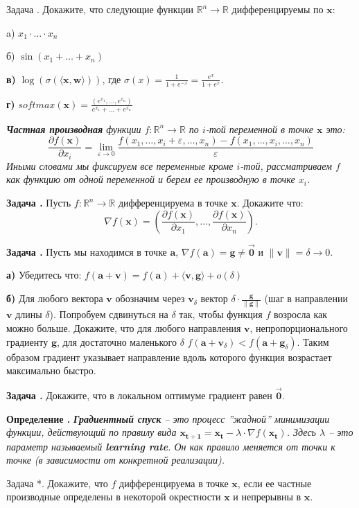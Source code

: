 \documentclass[12pt,a4paper]{article}
\def\R{\mathbb{R}}
\newcounter{znum}
\newcommand{\zz}[1]{\addtocounter{znum}{1} \textbf{Задача \arabic{znum}#1. }}
\newcommand{\z}[1]{\addtocounter{znum}{1} Задача \arabic{znum}#1. }
\newcounter{defnum}
\newcommand{\df}[1]{\addtocounter{defnum}{1} \textbf{Определение \arabic{defnum}.} {\it #1}}
\begin{document}
\z{} Докажите, что следующие функции $\R^n \to \R$ дифференцируемы по $\mathbf{x}$: \par
a) $x_1 \cdot \ldots \cdot x_n$ \par
б) $\sin(x_1 + \ldots + x_n)$ \par
\textbf{в)} $\log(\sigma(\langle \mathbf{x}, \mathbf{w} \rangle))$, где $\sigma(x) = \frac{1}{1 + e^{-x}} = \frac{e^{x}}{1 + e^{x}}.$\par
\textbf{г)} $softmax(\mathbf{x}) = \frac{(e^{x_1}, \ldots, e^{x_n})}{e^{x_1} + \ldots + e^{x_n}}$\par

{\it \textbf{Частная производная} функции $f : \R^n \to \R$ по $i$-той переменной в точке $\mathbf{x}$ это:
$$ \frac{\partial f(\mathbf{x})}{\partial x_i} = \lim_{\varepsilon \to 0} \frac{f(x_1, \ldots, x_i + \varepsilon,\ldots, x_n) - f(x_1, \ldots, x_i,\ldots, x_n)}{\varepsilon} $$
Иными словами мы фиксируем все переменные кроме $i$-той, рассматриваем $f$ как функцию от одной переменной и берем ее производную в точке $x_i$.
}

\zz{} Пусть $f : \R^n \to \R$ дифференцируема в точке $\mathbf{x}$. Докажите что:
$$ \nabla f(\mathbf{x}) = \left(\frac{\partial f(\mathbf{x})}{\partial x_1}, \ldots, \frac{\partial f(\mathbf{x})}{\partial x_n}\right) .$$

\zz{} Пусть мы находимся в точке $\mathbf{a}$, $\nabla f(\mathbf{a}) = \mathbf{g} \ne \overrightarrow{\mathbf{0}}$
 и $\| \mathbf{v} \| = \delta \to 0$.

\textbf{а)} Убедитесь что: $ f(\mathbf{a} + \mathbf{v}) = f(\mathbf{a}) + \langle \mathbf{v}, \mathbf{g} \rangle + o(\delta)$\par
\textbf{б)} Для любого вектора $\mathbf{v}$ обозначим через $\mathbf{v}_\delta$ вектор $\delta \cdot \frac{\mathbf{g}}{\|\mathbf{g}\|}$ (шаг в направлении $\mathbf{v}$ длины $\delta$). Попробуем сдвинуться на $\delta$ так, чтобы функция $f$ возросла как можно больше. Докажите, что для любого направления $\mathbf{v}$, непропорционального градиенту $\mathbf{g}$,  для достаточно маленького $\delta$ $f(\mathbf{a} + \mathbf{v}_\delta) < f(\mathbf{a} + \mathbf{g}_\delta)$. Таким образом градиент указывает направление вдоль которого функция возрастает максимально быстро.

\zz{} Докажите, что в локальном оптимуме градиент равен $\overrightarrow{\mathbf{0}}$.

\df{\textbf{Градиентный спуск} -- это процесс ''жадной'' минимизации функции, действующий по правилу вида $\mathbf{x_{t + 1}} = \mathbf{x_{t}} - \lambda \cdot \nabla f(\mathbf{x_{t}})$. Здесь $\lambda$ -- это параметр называемый \textbf{learning rate}. Он как правило меняется от точки к точке (в зависимости от конкретной реализации).}

\z{*} Докажите, что $f$ дифференцируема в точке $\mathbf{x}$, если ее частные производные определены в некоторой окрестности $\mathbf{x}$ и непрерывны в $\mathbf{x}$.
\end{document}
